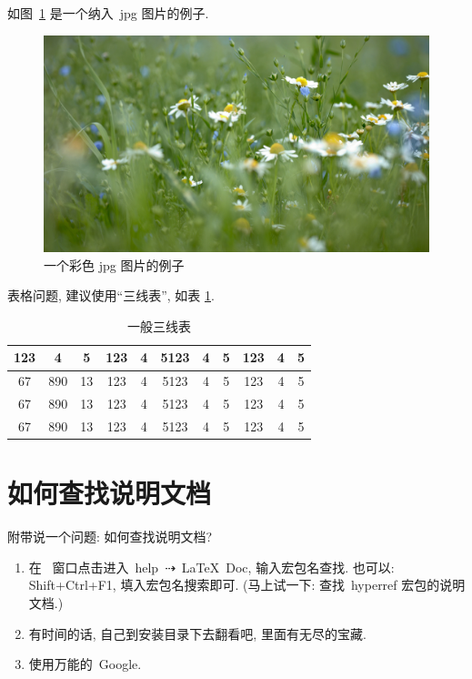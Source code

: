 \documentclass{whuBSthesis}%
\begin{document}
如图~\ref{fig:1} 是一个纳入~jpg 图片的例子.

\begin{figure}[ht]
\centering
  \includegraphics[width=\textwidth]{Daisy.jpg}
  \caption{一个彩色 jpg 图片的例子}
  \label{fig:1}
\end{figure}

表格问题, 建议使用``三线表'', 如表 \ref{tab:1}.

\begin{table}[ht]
\centering
\caption{一般三线表}
\label{tab:1}
    \begin{tabular}{c c c c c c c c c c c}
    \hline
    123 & 4  & 5  & 123 & 4 & 5123 & 4 & 5 & 123 & 4 & 5\\
    \hline
    67 & 890 & 13 & 123 & 4 & 5123 & 4 & 5 & 123 & 4 & 5\\
    67 & 890 & 13 & 123 & 4 & 5123 & 4 & 5 & 123 & 4 & 5\\
    67 & 890 & 13 & 123 & 4 & 5123 & 4 & 5 & 123 & 4 & 5\\
    \hline
    \end{tabular}
\end{table}



\section{如何查找说明文档}
附带说一个问题: 如何查找说明文档?
 \begin{enumerate}
    \item  在~\WinEdt{} 窗口点击进入~help~$\dashrightarrow$~LaTeX~Doc, 输入宏包名查找.
           也可以: Shift+Ctrl+F1, 填入宏包名搜索即可. ({\kaishu 马上试一下: 查找~hyperref 宏包的说明文档.})
    \item 有时间的话, 自己到安装目录下去翻看吧, 里面有无尽的宝藏.
    \item 使用万能的~Google.
\end{enumerate}
\end{document}
